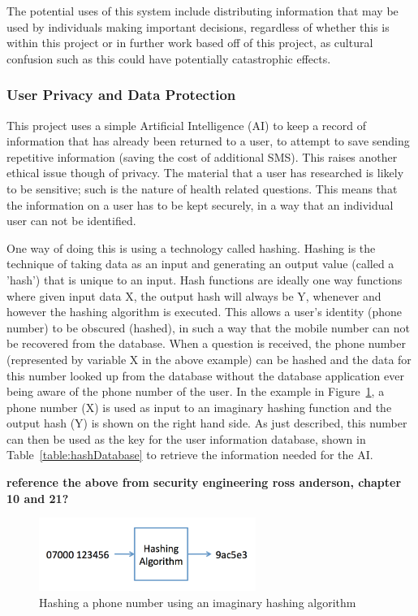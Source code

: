 \documentclass{article}
\begin{document}
The potential uses of this system include distributing information that may be used by individuals making important decisions, regardless of whether this is within this project or in further work based off of this project, as cultural confusion such as this could have potentially catastrophic effects.

\label{subsubsec:userPrivacyAndDataProtection}
\subsubsection{User Privacy and Data Protection}
This project uses a simple Artificial Intelligence (AI) to keep a record of information that has already been returned to a user, to attempt to save sending repetitive information (saving the cost of additional SMS).  This raises another ethical issue though of privacy.  The material that a user has researched is likely to be sensitive; such is the nature of health related questions.  This means that the information on a user has to be kept securely, in a way that an individual user can not be identified.

One way of doing this is using a technology called hashing.  Hashing is the technique of taking data as an input and generating an output value (called a 'hash') that is unique to an input.  Hash functions are ideally one way functions where given input data X, the output hash will always be Y, whenever and however the hashing algorithm is executed.  This allows a user's identity (phone number) to be obscured (hashed), in such a way that the mobile number can not be recovered from the database.  When a question is received, the phone number (represented by variable X in the above example) can be hashed and the data for this number looked up from the database without the database application ever being aware of the phone number of the user.  In the example in Figure~\ref{fig:hashPhoneNumber}, a phone number (X) is used as input to an imaginary hashing function and the output hash (Y) is shown on the right hand side.  As just described, this number can then be used as the key for the user information database, shown in Table~\ref{table:hashDatabase} to retrieve the information needed for the AI.

{\bf reference the above from security engineering ross anderson, chapter 10 and 21?}

\begin{figure}[htb]
    \centering
    \includegraphics[width=200pt]{hashPhoneNumber}
    \caption{Hashing a phone number using an imaginary hashing algorithm}
    \label{fig:hashPhoneNumber}
\end{figure}
\end{document}
